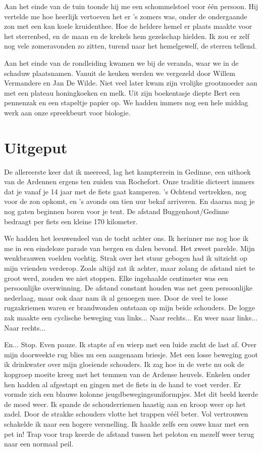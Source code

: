 \documentclass[12pt, justified, a4paper, symmetric]{tufte-book}
\begin{document}
Aan het einde van de tuin toonde hij me een schommelstoel voor \'e\'en persoon. Hij vertelde me hoe heerlijk vertoeven het er 's zomers was, onder de ondergaande zon met een kan koele kruidenthee. Hoe de heldere hemel er plaats maakte voor het sterrenbed, en de maan en de krekels hem gezelschap hielden. Ik zou er zelf nog vele zomeravonden zo zitten, turend naar het hemelgewelf, de sterren tellend.

Aan het einde van de rondleiding kwamen we bij de veranda, waar we in de schaduw plaatsnamen. Vanuit de keuken werden we vergezeld door Willem Vermandere en Jan De Wilde. Niet veel later kwam zijn vrolijke grootmoeder aan met een plateau honingkoeken en melk. Uit zijn boekentasje diepte Bert een pennenzak en een stapeltje papier op. We hadden immers nog een hele middag werk aan onze spreekbeurt voor biologie.

\newpage
\section{Uitgeput}
De allereerste keer dat ik meereed, lag het kampterrein in Gedinne, een uithoek van de Ardennen ergens ten zuiden van Rochefort. Onze traditie dicteert immers dat je vanaf je 14 jaar met de fiets gaat kamperen. 's Ochtend vertrekken, nog voor de zon opkomt, en 's avonds om tien uur bekaf arriveren. En daarna mag je nog gaten beginnen boren voor je tent. De afstand Buggenhout/Gedinne bedraagt per fiets een kleine 170 kilometer.

We hadden het leeuwendeel van de tocht achter ons. Ik herinner me nog hoe ik me in een eindeloze parade van bergen en dalen bevond. Het zweet parelde. Mijn wenkbrauwen voelden vochtig. Strak over het stuur gebogen had ik uitzicht op mijn vrienden verderop. Zoals altijd zat ik achter, maar zolang de afstand niet te groot werd, zouden we niet stoppen. Elke ingehaalde centimeter was een persoonlijke overwinning. De afstand constant houden was net geen persoonlijke nederlaag, maar ook daar nam ik al genoegen mee. Door de veel te losse rugzakriemen waren er brandwonden ontstaan op mijn beide schouders. De logge zak maakte een cyclische beweging van links... Naar rechts... En weer naar links... Naar rechts...

En... Stop. Even pauze. Ik stapte af en wierp met een luide zucht de last af. Over mijn doorweekte rug blies nu een aangenaam briesje. Met een losse beweging goot ik drinkwater over mijn gloeiende schouders. Ik zag hoe in de verte nu ook de kopgroep moeite kreeg met het temmen van de Ardense heuvels. Enkelen onder hen hadden al afgestapt en gingen met de fiets in de hand te voet verder. Er vormde zich een blauwe kolonne jeugdbewegingsuniformpjes. Met dit beeld keerde de moed weer. Ik spande de schouderriemen haastig aan en kroop weer op het zadel. Door de strakke schouders vlotte het trappen v\'e\'el beter. Vol vertrouwen schakelde ik naar een hogere versnelling. Ik haalde zelfs een ouwe knar met een pet in! Trap voor trap keerde de afstand tussen het peloton en mezelf weer terug naar een normaal peil.
\end{document}
